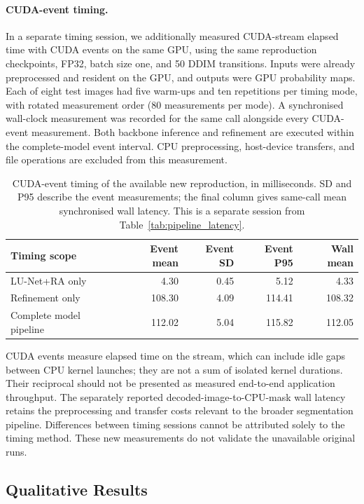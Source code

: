\documentclass[jimaging,article,submit,pdftex,moreauthors]
  {Definitions/mdpi}
\begin{document}
\paragraph{CUDA-event timing.}
In a separate timing session, we additionally measured CUDA-stream elapsed time with CUDA events on the same GPU, using the same reproduction checkpoints, FP32, batch size one, and 50 DDIM transitions. Inputs were already preprocessed and resident on the GPU, and outputs were GPU probability maps. Each of eight test images had five warm-ups and ten repetitions per timing mode, with rotated measurement order (80 measurements per mode). A synchronised wall-clock measurement was recorded for the same call alongside every CUDA-event measurement. Both backbone inference and refinement are executed within the complete-model event interval. CPU preprocessing, host-device transfers, and file operations are excluded from this measurement.

\begin{table}[htbp]
\centering
\caption{CUDA-event timing of the available new reproduction, in milliseconds. SD and P95 describe the event measurements; the final column gives same-call mean synchronised wall latency. This is a separate session from Table~\ref{tab:pipeline_latency}.}
\label{tab:cuda_event_latency}
\small
\begin{tabular}{lrrrr}
\toprule
Timing scope & Event mean & Event SD & Event P95 & Wall mean \\
\midrule
LU-Net+RA only & 4.30 & 0.45 & 5.12 & 4.33 \\
Refinement only & 108.30 & 4.09 & 114.41 & 108.32 \\
Complete model pipeline & 112.02 & 5.04 & 115.82 & 112.05 \\
\bottomrule
\end{tabular}
\end{table}

CUDA events measure elapsed time on the stream, which can include idle gaps between CPU kernel launches; they are not a sum of isolated kernel durations. Their reciprocal should not be presented as measured end-to-end application throughput. The separately reported decoded-image-to-CPU-mask wall latency retains the preprocessing and transfer costs relevant to the broader segmentation pipeline. Differences between timing sessions cannot be attributed solely to the timing method. These new measurements do not validate the unavailable original runs.

\subsection{Qualitative Results}
\end{document}

